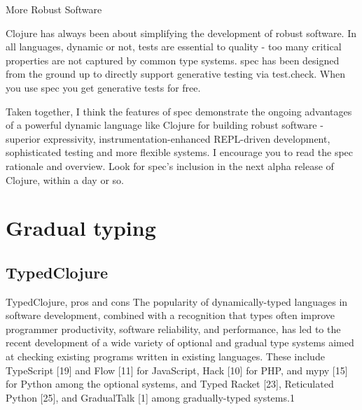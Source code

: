 More Robust Software

Clojure has always been about simplifying the development of robust software. In all languages, dynamic or not, tests are essential to quality - too many critical properties are not captured by common type systems. spec has been designed from the ground up to directly support generative testing via test.check. When you use spec you get generative tests for free.

Taken together, I think the features of spec demonstrate the ongoing advantages of a powerful dynamic language like Clojure for building robust software - superior expressivity, instrumentation-enhanced REPL-driven development, sophisticated testing and more flexible systems. I encourage you to read the spec rationale and overview. Look for spec’s inclusion in the next alpha release of Clojure, within a day or so.



\section{Gradual typing}
\subsection{TypedClojure}
TypedClojure, pros and cons
\cite{bonnaire2016practical}
The popularity of dynamically-typed languages in software development, combined
with a recognition that types often improve programmer productivity,
software reliability, and performance, has led to the recent development of a wide
variety of optional and gradual type systems aimed at checking existing programs
written in existing languages. These include TypeScript [19] and Flow [11] for
JavaScript, Hack [10] for PHP, and mypy [15] for Python among the optional
systems, and Typed Racket [23], Reticulated Python [25], and GradualTalk [1]
among gradually-typed systems.1


